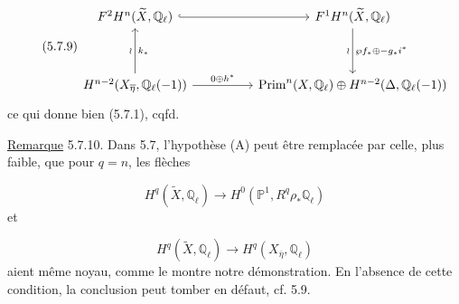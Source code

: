 \begin{equation}\tag{5.7.9}
\begin{tikzcd}[column sep=huge, row sep=huge]
F^2H^n(\widetilde{X},\mathbb{Q}_\ell) \arrow[r, hook] & F^1H^n(\widetilde{X},\mathbb{Q}_\ell) \arrow[d, "\wr"', "\wp f_*\oplus -g_*i^*"] \\
H^{n-2}(X_{\overline{\eta}},\mathbb{Q}_\ell(-1)) \arrow[u, "\wr", "k_*"'] \arrow[r, "0 \oplus h^*"] & \mathrm{Prim}^n(X,\mathbb{Q}_\ell)\oplus H^{n-2}(\Delta,\mathbb{Q}_\ell(-1))
\end{tikzcd}
\end{equation}
ce qui donne bien (5.7.1), cqfd.



\underline{Remarque} 5.7.10. Dans 5.7, l'hypothèse (A) peut être remplacée par celle, plus faible, que pour $q = n$, les flèches

\begin{equation}\tag{5.7.11}
H^q(\widetilde{X},\mathbb{Q}_\ell) \longrightarrow H^0(\mathbb{P}^1,R^q\rho_*\mathbb{Q}_\ell)
\end{equation}
et

\begin{equation}\tag{5.7.12}
H^q(\widetilde{X},\mathbb{Q}_\ell) \longrightarrow H^q(X_{\overline{\eta}},\mathbb{Q}_\ell)
\end{equation}
aient même noyau, comme le montre notre démonstration. En l'absence de cette condition, la conclusion peut tomber en défaut, cf. 5.9.


